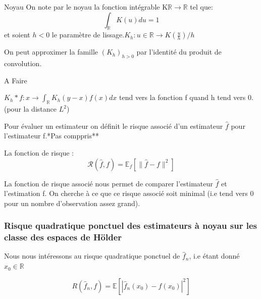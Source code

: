 \documentclass[
]{article}
\begin{document}
\begin{definition} {Noyau}  
On note par le noyau la fonction intégrable K$\mathbb{R}\rightarrow\mathbb{R}$ tel que:
$$\int_{\mathbb{R}}K(u)du =1$$
et soient $h<0$ le paramètre de lissage.\newline $K_h : u\in \mathbb{R} \rightarrow K(\frac{u}{h})/h$

\end{definition}

\begin{lemma}
On peut approximer la famille $(K_h)_{h>0}$ par l'identité du produit de convolution.
\end{lemma}

\begin{demonstration}
A Faire
\end{demonstration}

\begin{corollary}
$K_h * f : x \rightarrow \int_{\mathbb R} K_h(y-x) f(x) dx$ tend vers la fonction f quand h tend vers 0.(pour la distance $L^2$)
\end{corollary}

Pour évaluer un estimateur on définit le risque associé d'un estimateur
\(\hat f\) pour l'estimateur f.\newline **Pas comppris**

\begin{definition} 
La fonction de risque : 
$$ 
\mathcal R(\hat f ,f)=\mathbb E_f[\parallel\hat f -f\parallel^2]
$$
\end{definition}

\begin{remark}
  La fonction de risque associé nous permet de comparer l'estimateur $\hat f$ et l'estimation f.\newline
On cherche à ce que ce risque associé soit minimal (i.e tend vers 0 pour un nombre d'observation assez grand).\newline
\end{remark}

\subsubsection{Risque quadratique ponctuel des estimateurs à noyau sur les classe des espaces de Hölder}

Nous nous intéressons au risque quadratique ponctuel de \(\hat{f}_n\),
i.e étant donné\newline \(x_0 \in \mathbb{R}\)

\[
R(\hat {f}_n, f) = \mathbb{E}[|\hat {f}_n(x_0) - f(x_0)|^2]
\]
\end{document}
